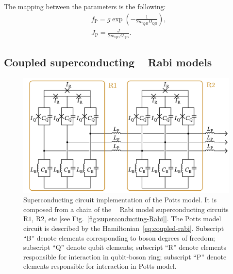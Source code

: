 \documentclass[reprint, aps, prx, amsmath, amssymb, longbibliography, superscriptaddress]{revtex4-2}
\DeclareMathOperator{\Zthree}{\mathbb{Z}_3}
\begin{document}
The mapping between the parameters is the following:
\begin{equation}
\begin{aligned}
    &f_{\text{P}} = g \exp\left(-\frac{1}{2 m_{QB} \Omega_{\text{QB}}}\right),\\
    &J_{\text{P}} = \frac{J }{2 m_{\text{QB}} \Omega_{\text{QB}}} .
\end{aligned}
\end{equation}

\subsection{Coupled superconducting \texorpdfstring{$\Zthree$}{Z3} Rabi models}


\begin{figure}[t]
    \includegraphics[width=\linewidth]{pics/SC_Potts_circuit_with_contours.pdf}
    \caption{Superconducting circuit implementation of the Potts model. It is composed from a chain of the $\Zthree$ Rabi model superconducting circuits $\mathrm{R1}$, $\mathrm{R2}$, etc [see Fig.~\ref{fig:superconducting-Rabi}]. The Potts model circuit is described by the Hamiltonian~\eqref{eq:coupled-rabi}. Subscript ``B'' denote elements corresponding to boson degrees of freedom; subscript ``Q'' denote qubit elements; subscript ``R'' denote elements responsible for interaction in qubit-boson ring; subscript ``P'' denote elements responsible for interaction in Potts model.}
    \label{fig:superconducting-potts}
\end{figure}
\end{document}
